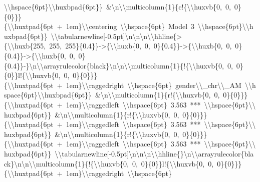 \documentclass[
  english,
  man]{apa6}
\begin{document}
\textbackslash{}\textbackslash{}hspace\{6pt\}\textbackslash{}\textbackslash{}huxbpad\{6pt\}\}\ \&\textbackslash{}n\textbackslash{}\textbackslash{}multicolumn\{1\}\{c!\{\textbackslash{}\textbackslash{}huxvb\{0,\ 0,\ 0\}\{0\}\}\}\{\textbackslash{}\textbackslash{}huxtpad\{6pt\ +\ 1em\}\textbackslash{}\textbackslash{}centering\ \textbackslash{}\textbackslash{}hspace\{6pt\}\ Model\ 3\ \textbackslash{}\textbackslash{}hspace\{6pt\}\textbackslash{}\textbackslash{}huxbpad\{6pt\}\}\ \textbackslash{}\textbackslash{}tabularnewline{[}-0.5pt{]}\textbackslash{}n\textbackslash{}n\textbackslash{}n\textbackslash{}\textbackslash{}hhline\{\textgreater{}\{\textbackslash{}\textbackslash{}huxb\{255,\ 255,\ 255\}\{0.4\}\}-\textgreater{}\{\textbackslash{}\textbackslash{}huxb\{0,\ 0,\ 0\}\{0.4\}\}-\textgreater{}\{\textbackslash{}\textbackslash{}huxb\{0,\ 0,\ 0\}\{0.4\}\}-\textgreater{}\{\textbackslash{}\textbackslash{}huxb\{0,\ 0,\ 0\}\{0.4\}\}-\}\textbackslash{}n\textbackslash{}\textbackslash{}arrayrulecolor\{black\}\textbackslash{}n\textbackslash{}n\textbackslash{}\textbackslash{}multicolumn\{1\}\{!\{\textbackslash{}\textbackslash{}huxvb\{0,\ 0,\ 0\}\{0\}\}l!\{\textbackslash{}\textbackslash{}huxvb\{0,\ 0,\ 0\}\{0\}\}\}\{\textbackslash{}\textbackslash{}huxtpad\{6pt\ +\ 1em\}\textbackslash{}\textbackslash{}raggedright\ \textbackslash{}\textbackslash{}hspace\{6pt\}\ gender\textbackslash{}\textbackslash{}\_chr\textbackslash{}\textbackslash{}\_AM\ \textbackslash{}\textbackslash{}hspace\{6pt\}\textbackslash{}\textbackslash{}huxbpad\{6pt\}\}\ \&\textbackslash{}n\textbackslash{}\textbackslash{}multicolumn\{1\}\{r!\{\textbackslash{}\textbackslash{}huxvb\{0,\ 0,\ 0\}\{0\}\}\}\{\textbackslash{}\textbackslash{}huxtpad\{6pt\ +\ 1em\}\textbackslash{}\textbackslash{}raggedleft\ \textbackslash{}\textbackslash{}hspace\{6pt\}\ 3.563\ ***\ \textbackslash{}\textbackslash{}hspace\{6pt\}\textbackslash{}\textbackslash{}huxbpad\{6pt\}\}\ \&\textbackslash{}n\textbackslash{}\textbackslash{}multicolumn\{1\}\{r!\{\textbackslash{}\textbackslash{}huxvb\{0,\ 0,\ 0\}\{0\}\}\}\{\textbackslash{}\textbackslash{}huxtpad\{6pt\ +\ 1em\}\textbackslash{}\textbackslash{}raggedleft\ \textbackslash{}\textbackslash{}hspace\{6pt\}\ 3.563\ ***\ \textbackslash{}\textbackslash{}hspace\{6pt\}\textbackslash{}\textbackslash{}huxbpad\{6pt\}\}\ \&\textbackslash{}n\textbackslash{}\textbackslash{}multicolumn\{1\}\{r!\{\textbackslash{}\textbackslash{}huxvb\{0,\ 0,\ 0\}\{0\}\}\}\{\textbackslash{}\textbackslash{}huxtpad\{6pt\ +\ 1em\}\textbackslash{}\textbackslash{}raggedleft\ \textbackslash{}\textbackslash{}hspace\{6pt\}\ 3.563\ ***\ \textbackslash{}\textbackslash{}hspace\{6pt\}\textbackslash{}\textbackslash{}huxbpad\{6pt\}\}\ \textbackslash{}\textbackslash{}tabularnewline{[}-0.5pt{]}\textbackslash{}n\textbackslash{}n\textbackslash{}n\textbackslash{}\textbackslash{}hhline\{\}\textbackslash{}n\textbackslash{}\textbackslash{}arrayrulecolor\{black\}\textbackslash{}n\textbackslash{}n\textbackslash{}\textbackslash{}multicolumn\{1\}\{!\{\textbackslash{}\textbackslash{}huxvb\{0,\ 0,\ 0\}\{0\}\}l!\{\textbackslash{}\textbackslash{}huxvb\{0,\ 0,\ 0\}\{0\}\}\}\{\textbackslash{}\textbackslash{}huxtpad\{6pt\ +\ 1em\}\textbackslash{}\textbackslash{}raggedright\ \textbackslash{}\textbackslash{}hspace\{6pt\}\ \ 
\end{document}
